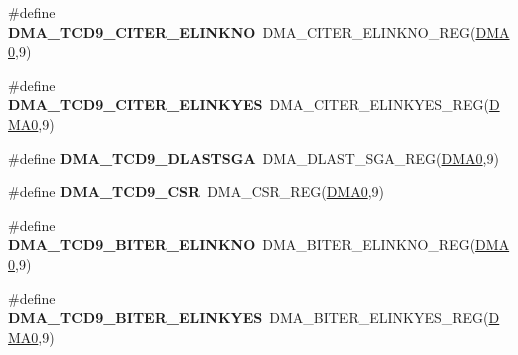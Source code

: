 \begin{DoxyCompactItemize}
\item 
\#define {\bfseries D\+M\+A\+\_\+\+T\+C\+D9\+\_\+\+C\+I\+T\+E\+R\+\_\+\+E\+L\+I\+N\+K\+NO}~D\+M\+A\+\_\+\+C\+I\+T\+E\+R\+\_\+\+E\+L\+I\+N\+K\+N\+O\+\_\+\+R\+EG(\hyperlink{group__DMA__Peripheral__Access__Layer_ga4103044f9ca209772f513dc694513ffb}{D\+M\+A0},9)\hypertarget{group__DMA__Register__Accessor__Macros_ga058c1b0e7625a041c6fff963a6de5af9}{}\label{group__DMA__Register__Accessor__Macros_ga058c1b0e7625a041c6fff963a6de5af9}

\item 
\#define {\bfseries D\+M\+A\+\_\+\+T\+C\+D9\+\_\+\+C\+I\+T\+E\+R\+\_\+\+E\+L\+I\+N\+K\+Y\+ES}~D\+M\+A\+\_\+\+C\+I\+T\+E\+R\+\_\+\+E\+L\+I\+N\+K\+Y\+E\+S\+\_\+\+R\+EG(\hyperlink{group__DMA__Peripheral__Access__Layer_ga4103044f9ca209772f513dc694513ffb}{D\+M\+A0},9)\hypertarget{group__DMA__Register__Accessor__Macros_ga0d2e7773109a62951a808fab4a29515f}{}\label{group__DMA__Register__Accessor__Macros_ga0d2e7773109a62951a808fab4a29515f}

\item 
\#define {\bfseries D\+M\+A\+\_\+\+T\+C\+D9\+\_\+\+D\+L\+A\+S\+T\+S\+GA}~D\+M\+A\+\_\+\+D\+L\+A\+S\+T\+\_\+\+S\+G\+A\+\_\+\+R\+EG(\hyperlink{group__DMA__Peripheral__Access__Layer_ga4103044f9ca209772f513dc694513ffb}{D\+M\+A0},9)\hypertarget{group__DMA__Register__Accessor__Macros_ga0ec6976994ee346eac1875e848eb5468}{}\label{group__DMA__Register__Accessor__Macros_ga0ec6976994ee346eac1875e848eb5468}

\item 
\#define {\bfseries D\+M\+A\+\_\+\+T\+C\+D9\+\_\+\+C\+SR}~D\+M\+A\+\_\+\+C\+S\+R\+\_\+\+R\+EG(\hyperlink{group__DMA__Peripheral__Access__Layer_ga4103044f9ca209772f513dc694513ffb}{D\+M\+A0},9)\hypertarget{group__DMA__Register__Accessor__Macros_ga749263dc7d3a0d1a02d6446098555380}{}\label{group__DMA__Register__Accessor__Macros_ga749263dc7d3a0d1a02d6446098555380}

\item 
\#define {\bfseries D\+M\+A\+\_\+\+T\+C\+D9\+\_\+\+B\+I\+T\+E\+R\+\_\+\+E\+L\+I\+N\+K\+NO}~D\+M\+A\+\_\+\+B\+I\+T\+E\+R\+\_\+\+E\+L\+I\+N\+K\+N\+O\+\_\+\+R\+EG(\hyperlink{group__DMA__Peripheral__Access__Layer_ga4103044f9ca209772f513dc694513ffb}{D\+M\+A0},9)\hypertarget{group__DMA__Register__Accessor__Macros_gad23dc537bb2e195e067b8e949e20f7ed}{}\label{group__DMA__Register__Accessor__Macros_gad23dc537bb2e195e067b8e949e20f7ed}

\item 
\#define {\bfseries D\+M\+A\+\_\+\+T\+C\+D9\+\_\+\+B\+I\+T\+E\+R\+\_\+\+E\+L\+I\+N\+K\+Y\+ES}~D\+M\+A\+\_\+\+B\+I\+T\+E\+R\+\_\+\+E\+L\+I\+N\+K\+Y\+E\+S\+\_\+\+R\+EG(\hyperlink{group__DMA__Peripheral__Access__Layer_ga4103044f9ca209772f513dc694513ffb}{D\+M\+A0},9)\hypertarget{group__DMA__Register__Accessor__Macros_ga256aa9d7f919cfb32f87d4e828ed7771}{}\label{group__DMA__Register__Accessor__Macros_ga256aa9d7f919cfb32f87d4e828ed7771}


\end{DoxyCompactItemize}
